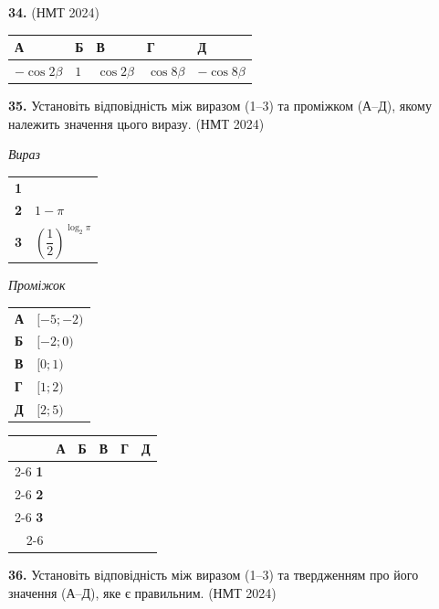 \documentclass[14pt]{extarticle}
\newcommand{\answerTableTall}[5]{
\begin{center}
\begin{tabular}{|*{5}{>{\centering\arraybackslash}m{2.8cm}|}}
\hline
\rule[-0.3cm]{0pt}{0.8cm}\textbf{А} & \textbf{Б} & \textbf{В} & \textbf{Г} & \textbf{Д} \\
\hline
\rule[-0.9cm]{0pt}{2.0cm}#1 & 
\rule[-0.9cm]{0pt}{2.0cm}#2 & 
\rule[-0.9cm]{0pt}{2.0cm}#3 & 
\rule[-0.9cm]{0pt}{2.0cm}#4 & 
\rule[-0.9cm]{0pt}{2.0cm}#5 \\
\hline
\end{tabular}
\end{center}
}
\newcommand{\answerGrid}{
    \begingroup
    \renewcommand{\arraystretch}{1.3} 
    \setlength{\tabcolsep}{7pt} 
    \begin{tabular}{r|c|c|c|c|c|}
         \multicolumn{1}{c}{} & \multicolumn{1}{c}{\textbf{А}} & \multicolumn{1}{c}{\textbf{Б}} & \multicolumn{1}{c}{\textbf{В}} & \multicolumn{1}{c}{\textbf{Г}} & \multicolumn{1}{c}{\textbf{Д}} \\ \cline{2-6}
         \textbf{1} & & & & & \\ \cline{2-6}
         \textbf{2} & & & & & \\ \cline{2-6}
         \textbf{3} & & & & & \\ \cline{2-6}
    \end{tabular}
    \endgroup
}
\newcommand{\matchingLayout}[3]{
    \noindent
    \begin{minipage}[t]{0.40\textwidth}
       
        #1
    \end{minipage}%
    \hfill
    \begin{minipage}[t]{0.28\textwidth}
        
        #2
    \end{minipage}%
    \hfill
    \begin{minipage}[t]{0.30\textwidth}
        \vspace{0pt} %
        \begin{flushright}
        #3
        \end{flushright}
    \end{minipage}
}
\newcommand{\nmtyear}[1]{\hfill{\small\color{yearcolor}(НМТ #1)}}
\begin{document}
\vspace{0.7cm}

\noindent\textbf{34.}  \nmtyear{2024}

\vspace{0.3cm}
\answerTableTall{$-\cos 2\beta$}{$1$}{$\cos 2\beta$}{$\cos 8\beta$}{$-\cos 8\beta$}

\vspace{0.7cm}

\noindent\textbf{35.} Установіть відповідність між виразом (1--3) та проміжком (А--Д), якому належить значення цього виразу. \nmtyear{2024}

\vspace{0.3cm}

\matchingLayout{
    \textit{Вираз} \par \vspace{0.2cm}
    \begin{tabular}{@{}p{0.5cm} l@{}}
    \textbf{1} & \trigStyle{$\operatorname{tg} \dfrac{\pi}{3}$} \\[0.4cm]
    \textbf{2} & $1-\pi$ \\[0.4cm]
    \textbf{3} & $\left(\dfrac{1}{2}\right)^{\log_2 \pi}$ \\
    \end{tabular}
}{
    \textit{Проміжок} \par \vspace{0.2cm}
    \begin{tabular}{@{}p{0.5cm} l@{}}
    \textbf{А} & $[-5; -2)$ \\[0.2cm]
    \textbf{Б} & $[-2; 0)$ \\[0.2cm]
    \textbf{В} & $[0; 1)$ \\[0.2cm]
    \textbf{Г} & $[1; 2)$ \\[0.2cm]
    \textbf{Д} & $[2; 5)$ \\
    \end{tabular}
}{
    \answerGrid
}

\vspace{0.7cm}

\noindent\textbf{36.} Установіть відповідність між виразом (1--3) та твердженням про його значення (А--Д), яке є правильним. \nmtyear{2024}

\vspace{0.3cm}
\end{document}
